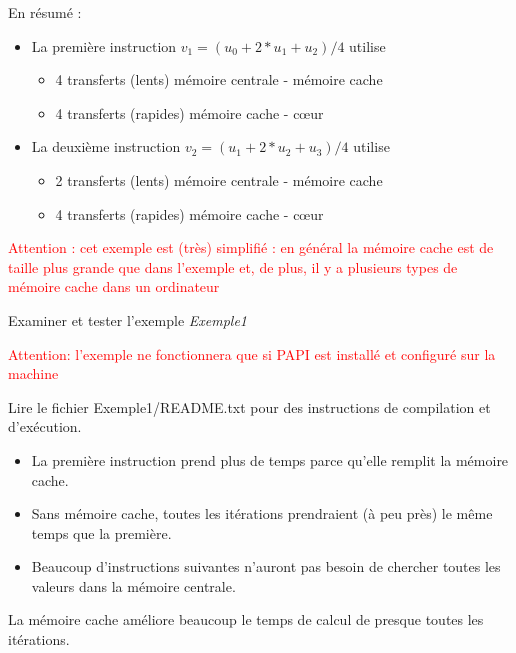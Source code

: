\documentclass{beamer}
\begin{document}
\begin{frame}
	En résumé :
	\begin{itemize}
		\item La première instruction $v_1 = (u_0 + 2*u_1 + u_2)/4$ utilise
		\begin{itemize}
			\item 4 transferts (lents) mémoire centrale - mémoire cache
			\item 4 transferts (rapides)  mémoire cache - c\oe ur
		\end{itemize} 
	\smallskip
		\item La deuxième instruction $v_2 = (u_1 + 2*u_2 + u_3)/4$ utilise
		\begin{itemize}
			\item 2 transferts (lents) mémoire centrale - mémoire cache
			\item 4 transferts (rapides) mémoire cache - c\oe ur
		\end{itemize}
	\end{itemize}
\vfill
    \textcolor{red}{Attention : cet exemple est (très) simplifié : en général la mémoire cache est de taille plus grande que dans l'exemple et, de plus, il y a plusieurs types de mémoire cache dans un ordinateur}
\end{frame}

\begin{frame}
\vfill
Examiner et tester l'exemple {\it Exemple1}

\textcolor{red}{Attention: l'exemple ne fonctionnera que si PAPI est installé et configuré sur la machine}

Lire le fichier Exemple1/README.txt pour des instructions de compilation et d'exécution.
 
\vfill
\begin{itemize}
	\item La première instruction prend plus de temps parce qu'elle remplit la mémoire cache.
	\item Sans mémoire cache, toutes les itérations prendraient (à peu près) le même temps que la première.
	\item Beaucoup d'instructions suivantes n'auront pas besoin de chercher toutes les valeurs dans la mémoire centrale.
\end{itemize}    
    
\vfill
    La mémoire cache améliore beaucoup le temps de calcul de presque toutes les itérations.
    

\end{frame}
\end{document}

